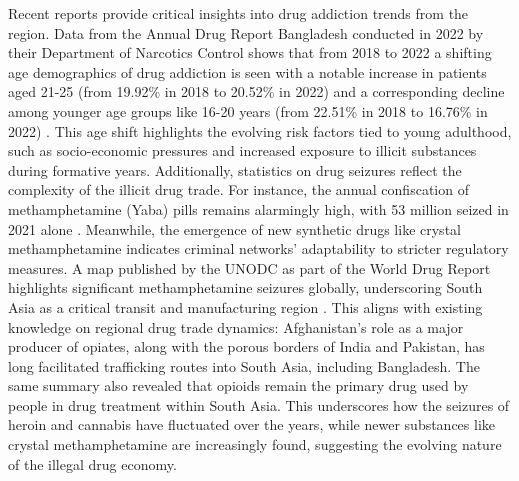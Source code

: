 \documentclass[conference]{IEEEtran}
\begin{document}
Recent reports provide critical insights into drug addiction trends from the region. Data from the Annual Drug Report Bangladesh conducted in 2022 by their Department of Narcotics Control shows that from 2018 to 2022 a shifting age demographics of drug addiction is seen with a notable increase in patients aged 21-25 (from 19.92\% in 2018 to 20.52\% in 2022) and a corresponding decline among younger age groups like 16-20 years (from 22.51\% in 2018 to 16.76\% in 2022) \cite{dnc2023}. This age shift highlights the evolving risk factors tied to young adulthood, such as socio-economic pressures and increased exposure to illicit substances during formative years. Additionally, statistics on drug seizures reflect the complexity of the illicit drug trade. For instance, the annual confiscation of methamphetamine (Yaba) pills remains alarmingly high, with 53 million seized in 2021 alone \cite{dnc2023}. Meanwhile, the emergence of new synthetic drugs like crystal methamphetamine indicates criminal networks' adaptability to stricter regulatory measures. A map published by the UNODC as part of the World Drug Report highlights significant methamphetamine seizures globally, underscoring South Asia as a critical transit and manufacturing region \cite{unodc2023}. This aligns with existing knowledge on regional drug trade dynamics: Afghanistan's role as a major producer of opiates, along with the porous borders of India and Pakistan, has long facilitated trafficking routes into South Asia, including Bangladesh. The same summary also revealed that opioids remain the primary drug used by people in drug treatment within South Asia. This underscores how the seizures of heroin and cannabis have fluctuated over the years, while newer substances like crystal methamphetamine are increasingly found, suggesting the evolving nature of the illegal drug economy.


\end{document}
